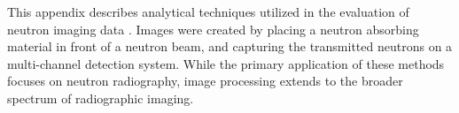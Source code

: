 \documentclass[../../main.tex]{subfiles}
\begin{document}
%
    \Xsection%
    This appendix describes analytical techniques utilized in the evaluation of neutron imaging data \cite{ASTM:E748-16}.
    Images were created by placing a neutron absorbing material in front of a neutron beam, and capturing the transmitted neutrons on a multi-channel detection system.
    While the primary application of these methods focuses on neutron radiography, image processing extends to the broader spectrum of radiographic imaging.
\end{document}
